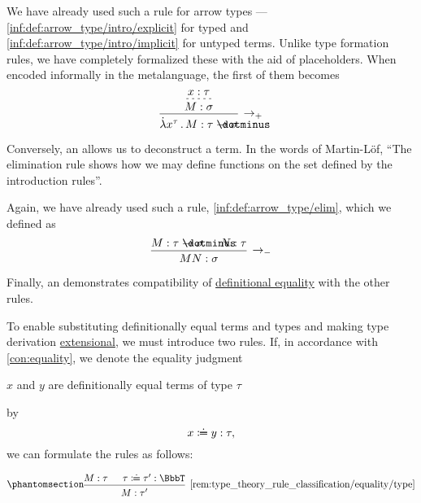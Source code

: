 \begin{remark}
\begin{thmenum}
    We have already used such a rule for arrow types --- \ref{inf:def:arrow_type/intro/explicit} for typed and \ref{inf:def:arrow_type/intro/implicit} for untyped terms. Unlike type formation rules, we have completely formalized these with the aid of placeholders. When encoded informally in the metalanguage, the first of them becomes
    \begin{equation*}
      \begin{prooftree}
        \hypo{ x: \tau }
        \infer[dashed]1{ M: \sigma }
        \infer1[\ensuremath{ \rightarrow_+ }]{ \qabs {x^{\tau}} M: \tau \synimplies \sigma }
      \end{prooftree}
    \end{equation*}

     Conversely, an  allows us to deconstruct a term. In the words of Martin-L\"of, \enquote{The elimination rule shows how we may define functions on the set defined by the introduction rules}.

    Again, we have already used such a rule, \ref{inf:def:arrow_type/elim}, which we defined as
    \begin{equation*}
      \begin{prooftree}
        \hypo{ M: \tau \synimplies \sigma }
        \hypo{ N: \tau }
        \infer2[\ensuremath{ \rightarrow_- }]{ M N: \sigma }
      \end{prooftree}
    \end{equation*}

     Finally, an  demonstrates compatibility of \hyperref[con:equality]{definitional equality} with the other rules.

    To enable substituting definitionally equal terms and types and making type derivation \hyperref[con:extensionality]{extensional}, we must introduce two rules. If, in accordance with \cref{con:equality}, we denote the equality judgment
    \begin{center}
      \( x \) and \( y \) are definitionally equal terms of type \( \tau \)
    \end{center}
    by
    \begin{equation*}
      x \syndefeq y: \tau,
    \end{equation*}
    we can formulate the rules as follows:
    \begin{paracol}{2}
      \begin{leftcolumn}
        \ParacolAlignmentHack
        \begin{equation*}\taglabel[\ensuremath{ \coloneqq_{\logic{type}} }]{rem:type_theory_rule_classification/equality/type}
          \begin{prooftree}
            \hypo{ M: \tau }
            \hypo{ \tau \syndefeq \tau': \BbbT }
            \infer2[\ref{rem:type_theory_rule_classification/equality/type}]{ M: \tau' }
          \end{prooftree}
        \end{equation*}
      \end{leftcolumn}


\end{paracol}
\end{thmenum}
\end{remark}
